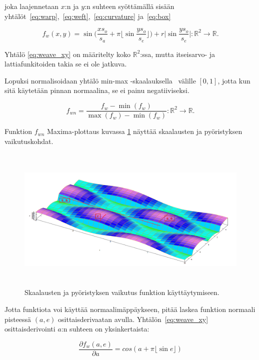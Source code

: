 \documentclass[utf8,bachelor]{gradu3}
\begin{document}
joka laajennetaan $x$:n ja $y$:n suhteen syöttämällä sisään yhtälöt~\eqref{eq:warp},~\eqref{eq:weft},~\eqref{eq:curvature} ja~\eqref{eq:box}

\begin{equation}
\label{eq:weave_xy}
f_w(x,y) = \sin{\big(\frac{xs_o}{s_a} + \pi \lfloor \sin{\frac{ys_o}{s_e}} \rfloor\big)} + r\lvert\sin{\frac{ys_o}{s_e}}\rvert : \mathbb{R}^2 \rightarrow \mathbb{R}.
\end{equation}

Yhtälö \ref{eq:weave_xy} on määritelty koko $\mathbb{R}^2$:ssa, mutta itseisarvo- ja lattiafunkitoiden takia se ei ole jatkuva. 

Lopuksi normalisoidaan yhtälö min-max -skaalauksella~\parencite{dmSlides5} välille $\left[0,1\right]$, jotta kun sitä käytetään pinnan normaalina, se ei painu negatiiviseksi.

\begin{equation}
\label{eq:weave_norm}
f_{wn} = \frac{f_w-\min{(f_w)}}{\max{(f_w)}-\min{(f_w)}} : \mathbb{R}^2 \rightarrow \mathbb{R}.
\end{equation}

Funktion $f_{wn}$ Maxima-plottaus kuvassa \ref{fig:maxima_scale} näyttää skaalausten ja pyöristyksen vaikutuskohdat. 

\begin{figure}[h] 
	\centering
	\includegraphics[height=7cm]{weave_plot_scales_maxima_small.png}
	\caption{Skaalausten ja pyöristyksen vaikutus funktion käyttäytymiseen.}
	\label{fig:maxima_scale}
\end{figure}

Jotta funktiota voi käyttää normaalimäppäykseen, pitää laskea funktion normaali pisteessä $(a,e)$ osittaisderivaatan avulla. Yhtälön~\ref{eq:weave_xy} osittaisderivointi $a$:n suhteen on yksinkertaista:

\begin{equation}
\label{eq:partialA}
\frac{\partial f_w(a,e)}{\partial a} = cos(a + \pi\lfloor \sin{e} \rfloor )
\end{equation}
\end{document}
